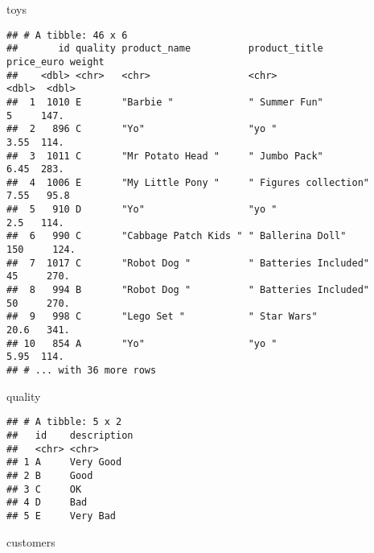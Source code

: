 \documentclass[
]{article}
\newenvironment{Shaded}{\begin{snugshade}}{\end{snugshade}}
\newcommand{\NormalTok}[1]{#1}
\begin{document}
\begin{Shaded}
\begin{Highlighting}[]
\NormalTok{toys }
\end{Highlighting}
\end{Shaded}

\begin{verbatim}
## # A tibble: 46 x 6
##       id quality product_name          product_title         price_euro weight
##    <dbl> <chr>   <chr>                 <chr>                      <dbl>  <dbl>
##  1  1010 E       "Barbie "             " Summer Fun"               5     147. 
##  2   896 C       "Yo"                  "yo "                       3.55  114. 
##  3  1011 C       "Mr Potato Head "     " Jumbo Pack"               6.45  283. 
##  4  1006 E       "My Little Pony "     " Figures collection"       7.55   95.8
##  5   910 D       "Yo"                  "yo "                       2.5   114. 
##  6   990 C       "Cabbage Patch Kids " " Ballerina Doll"         150     124. 
##  7  1017 C       "Robot Dog "          " Batteries Included"      45     270. 
##  8   994 B       "Robot Dog "          " Batteries Included"      50     270. 
##  9   998 C       "Lego Set "           " Star Wars"               20.6   341. 
## 10   854 A       "Yo"                  "yo "                       5.95  114. 
## # ... with 36 more rows
\end{verbatim}

\begin{Shaded}
\begin{Highlighting}[]
\NormalTok{quality}
\end{Highlighting}
\end{Shaded}

\begin{verbatim}
## # A tibble: 5 x 2
##   id    description
##   <chr> <chr>      
## 1 A     Very Good  
## 2 B     Good       
## 3 C     OK         
## 4 D     Bad        
## 5 E     Very Bad
\end{verbatim}

\begin{Shaded}
\begin{Highlighting}[]
\NormalTok{customers}
\end{Highlighting}
\end{Shaded}
\end{document}
